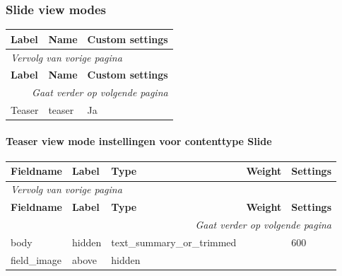 \subsubsection{Slide view modes}
  \begin{longtable}{| p{5.00cm}|p{5.00cm}|p{5.00cm}|}
  \hline
  \rowcolor{tableheader}
  \textbf{Label} & \textbf{Name} & \textbf{Custom settings}  \tabularnewline
  \hline
\endfirsthead
\multicolumn{3}{l}{\textit{Vervolg van vorige pagina}} \\
\hline
\rowcolor{tableheader}
  \textbf{Label} & \textbf{Name} & \textbf{Custom settings}  \tabularnewline
  \hline
\hline
\endhead
\multicolumn{3}{r}{\textit{Gaat verder op volgende pagina}} \\
\endfoot
\hline
\endlastfoot
  Teaser & teaser & Ja  \tabularnewline
  \hline
  \end{longtable}

\paragraph{Teaser view mode instellingen voor contenttype Slide }

  \begin{longtable}{| p{3.00cm}|p{3.00cm}|p{3.00cm}|p{3.00cm}|p{3.00cm}|}
  \hline
  \rowcolor{tableheader}
  \textbf{Fieldname} & \textbf{Label} & \textbf{Type} & \textbf{Weight} & \textbf{Settings}  \tabularnewline
  \hline
\endfirsthead
\multicolumn{5}{l}{\textit{Vervolg van vorige pagina}} \\
\hline
\rowcolor{tableheader}
  \textbf{Fieldname} & \textbf{Label} & \textbf{Type} & \textbf{Weight} & \textbf{Settings}  \tabularnewline
  \hline
\hline
\endhead
\multicolumn{5}{r}{\textit{Gaat verder op volgende pagina}} \\
\endfoot
\hline
\endlastfoot
  body & hidden & text\_summary\_or\_trimmed &   & 600  \tabularnewline
  \hline
  field\_image & above & hidden &   &    \tabularnewline
  \hline
  \end{longtable}

